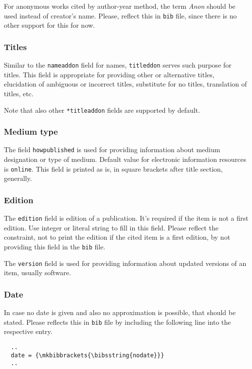 \documentclass[a4paper,10pt]{ltxdockit}
\def\t|#1|{\texttt{#1}}
\begin{document}
For anonymous works cited by author-year method, the term \textit{Anon}
should be used instead of creator's name. Please, reflect this
in \t|bib| file, since there is no other support for this for now.

\subsubsection{Titles}

Similar to the \t|nameaddon| field for names, \t|titleddon| serves such
purpose for titles. This field is appropriate for providing other or
alternative titles, elucidation of ambiguous or incorrect titles,
substitute for no titles, translation of titles, etc.

Note that also other \t|*titleaddon| fields are supported by default.

\subsubsection{Medium type}

The field \t|howpublished| is used for providing information about
medium designation or type of medium. Default value for electronic
information resources is \t|online|. This field is printed as is,
in square brackets after title section, generally.

\subsubsection{Edition}

The \t|edition| field is edition of a publication. It's required
if the item is not a first edition. Use integer or literal string
to fill in this field. Please reflect the constraint, not to print
the edition if the cited item is a first edition, by not providing
this field in the \t|bib| file.

The \t|version| field is used for providing information about
updated versions of an item, usually software.

\subsubsection{Date}

In case no date is given and also no approximation is possible, that
should be stated. Please reflects this in \t|bib| file by including
the following line into the respective entry.

\begin{verbatim}
  ..
  date = {\mkbibbrackets{\bibsstring{nodate}}}
  ..
\end{verbatim}
\end{document}
